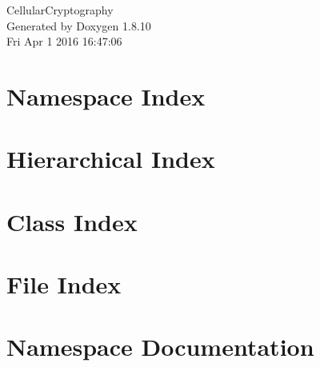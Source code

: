 \documentclass[twoside]{book}
\newcommand{\+}{\discretionary{\mbox{\scriptsize$\hookleftarrow$}}{}{}}
\newcommand{\clearemptydoublepage}{%
  \newpage{\pagestyle{empty}\cleardoublepage}%
}
\begin{document}
\hypersetup{pageanchor=false,
             bookmarks=true,
             bookmarksnumbered=true,
             pdfencoding=unicode
            }
\begin{titlepage}
\vspace*{7cm}
\begin{center}%
{\Large Cellular\+Cryptography }\\
\vspace*{1cm}
{\large Generated by Doxygen 1.8.10}\\
\vspace*{0.5cm}
{\small Fri Apr 1 2016 16:47:06}\\
\end{center}
\end{titlepage}
\clearemptydoublepage
\tableofcontents
\clearemptydoublepage
{}
\hypersetup{pageanchor=true}

\chapter{Namespace Index}

\chapter{Hierarchical Index}

\chapter{Class Index}

\chapter{File Index}

\chapter{Namespace Documentation}






\end{document}
